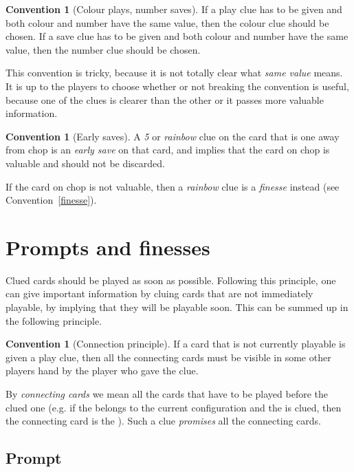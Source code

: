 \documentclass[a4paper]{article}
\theoremstyle{plain}
\theoremstyle{definition}
\newtheorem{convention}[theorem]{Convention}
\begin{document}
\begin{convention}[Colour plays, number saves]
	If a play clue has to be given and both colour and number have the same value, then the colour clue should be chosen. If a save clue has to be given and both colour and number have the same value, then the number clue should be chosen.
\end{convention}

This convention is tricky, because it is not totally clear what \textit{same value} means. It is up to the players to choose whether or not breaking the convention is useful, because one of the clues is clearer than the other or it passes more valuable information.

\begin{convention}[Early saves]
	A \textit{5} or \textit{rainbow} clue on the card that is one away from chop is an \textit{early save} on that card, and implies that the card on chop is valuable and should not be discarded.
	
	If the card on chop is not valuable, then a \textit{rainbow} clue is a \textit{finesse} instead (see Convention~\ref{finesse}).
\end{convention}

\section{Prompts and finesses}

Clued cards should be played as soon as possible. Following this principle, one can give important information by cluing cards that are not immediately playable, by implying that they will be playable soon. This can be summed up in the following principle.

\begin{convention}[Connection principle]
	\label{connection-principle}
	If a card that is not currently playable is given a play clue, then all the connecting cards must be visible in some other players hand by the player who gave the clue.
\end{convention}

By \textit{connecting cards} we mean all the cards that have to be played before the clued one (e.g. if the  belongs to the current configuration and the  is clued, then the connecting card is the ). Such a clue \emph{promises} all the connecting cards.

\subsection{Prompt}
\end{document}
